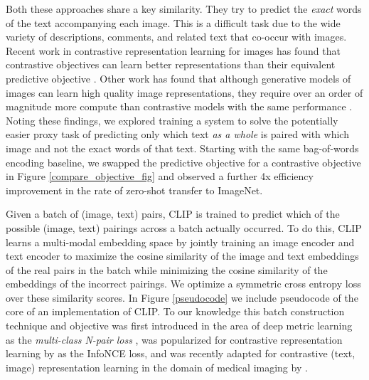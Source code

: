 \documentclass{article}
\begin{document}
Both these approaches share a key similarity. They try to predict the \textit{exact} words of the text accompanying each image. This is a difficult task due to the wide variety of descriptions, comments, and related text that co-occur with images. Recent work in contrastive representation learning for images has found that contrastive objectives can learn better representations than their equivalent predictive objective \citep{tian2019contrastive}. Other work has found that although generative models of images can learn high quality image representations, they require over an order of magnitude more compute than contrastive models with the same performance \citep{chen2020generative}. Noting these findings, we explored training a system to solve the potentially easier proxy task of predicting only which text \textit{as a whole} is paired with which image and not the exact words of that text. Starting with the same bag-of-words encoding baseline, we swapped the predictive objective for a contrastive objective in Figure \ref{compare_objective_fig} and observed a further 4x efficiency improvement in the rate of zero-shot transfer to ImageNet.

Given a batch of  (image, text) pairs, CLIP is trained to predict which of the  possible (image, text) pairings across a batch actually occurred. To do this, CLIP learns a multi-modal embedding space by jointly training an image encoder and text encoder to maximize the cosine similarity of the image and text embeddings of the  real pairs in the batch while minimizing the cosine similarity of the embeddings of the  incorrect pairings. We optimize a symmetric cross entropy loss over these similarity scores. In Figure \ref{pseudocode} we include pseudocode of the core of an implementation of CLIP. To our knowledge this batch construction technique and objective was first introduced in the area of deep metric learning as the \textit{multi-class N-pair loss} \citet{sohn2016improved}, was popularized for contrastive representation learning by \citet{oord2018representation} as the InfoNCE loss, and was recently adapted for contrastive (text, image) representation learning in the domain of medical imaging by \citet{zhang2020contrastive}.
\end{document}
